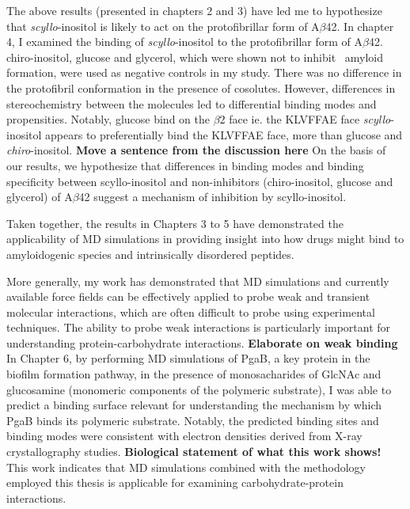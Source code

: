 The above results (presented in chapters 2 and 3) have led me to hypothesize that \textit{scyllo}-inositol is likely to act on the protofibrillar form of A$\beta$42.  In chapter 4, I examined the binding of \textit{scyllo}-inositol to the protofibrillar form of A$\beta$42. chiro-inositol, glucose and glycerol, which were shown not to inhibit \ amyloid formation, were used as negative controls in my study. There was no difference in the protofibril conformation in the presence of cosolutes. However, differences in stereochemistry between the molecules led to differential binding modes and propensities. Notably, glucose bind on the $\beta$2 face ie. the KLVFFAE face \textit{scyllo}-inositol appears to preferentially bind the KLVFFAE face, more than glucose and \textit{chiro}-inositol.  \textbf{Move a sentence from the discussion here} On the basis of our results, we hypothesize that differences in binding modes and binding specificity between scyllo-inositol and non-inhibitors (chiro-inositol, glucose and glycerol) of A$\beta$42 suggest a mechanism of inhibition by scyllo-inositol.

Taken together, the results in Chapters 3 to 5 have demonstrated the applicability of MD simulations in providing insight into how drugs might bind to amyloidogenic species and intrinsically disordered peptides. 

More generally, my work has demonstrated that MD simulations and currently available force fields can be effectively applied to probe weak and transient molecular interactions, which are often difficult to probe using experimental techniques. The ability to probe weak interactions is particularly important for understanding protein-carbohydrate interactions.\cite{weak binding review paper, carbohydrate binding paper .. elisa's review paper} \textbf{Elaborate on weak binding} In Chapter 6, by performing MD simulations of PgaB, a key protein in the biofilm formation pathway, in the presence of monosacharides of GlcNAc and glucosamine (monomeric components of the polymeric substrate), I was able to predict a binding surface relevant for understanding the mechanism by which PgaB binds its polymeric substrate. Notably, the predicted binding sites and binding modes were consistent with electron densities derived from X-ray crystallography studies. \textbf{Biological statement of what this work shows!} This work indicates that MD simulations combined with the methodology employed this thesis is applicable for examining carbohydrate-protein interactions.

